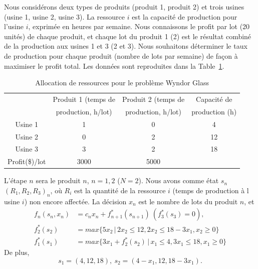 \begin{example}
Nous considérons deux types de produits (produit 1, produit 2) et trois usines (usine 1, usine 2, usine 3).
La ressource $i$ est la capacité de production pour l'usine $i$, exprimée en heures par semaine.
Nous connaissons le profit par lot (20 unités) de chaque produit, et chaque lot du produit 1 (2) est le résultat combiné de la production aux usines 1 et 3 (2 et 3).
Nous souhaitons déterminer le taux de production pour chaque produit (nombre de lots par semaine) de façon à maximiser le profit total.
Les données sont reproduites dans la Table~\ref{tab:wyndor_data}.
\begin{table}[htb]
\begin{center}
\begin{tabular}{|c|c|c|c|}
\hline
& Produit 1 (temps de & Produit 2 (temps de & Capacité de \\
& production, h/lot) & production, h/lot) & production (h) \\
\hline
Usine 1 & 1 & 0 & 4 \\
\hline
Usine 2 & 0 & 2 & 12 \\
\hline
Usine 3 & 3 & 2 & 18 \\
\hline
Profit(\$)/lot & 3000 & 5000 & \\
\hline
\end{tabular}
\end{center}
\label{tab:wyndor_data}
\caption{Allocation de ressources pour le problème Wyndor Glass}
\end{table}
L'étape $n$ sera le produit $n$, $n = 1,2$ ($N = 2$).
Nous avons comme état $s_n$ $(R_1,R_2,R_3)_n$, où $R_i$ est la quantité de la ressource $i$ (temps de production à l usine $i$) non encore affectée.
La décision $x_n$ est le nombre de lots du produit $n$, et
\begin{align*}
 f_n(s_n,x_n) &= c_nx_n + f_{n+1}^*(s_{n+1})\ (f_3^*(s_3) = 0),\\
 f_2^*(s_2) &= max \lbrace 5x_2\,|\,2x_2 \leq12, 2x_2 \leq 18 - 3x_1, x_2 \geq 0 \rbrace \\
 f_1^*(s_1) &= max \lbrace 3x_1+f_2^*(s_2)\,|\,x_1 \leq 4, 3x_1 \leq 18, x_1 \geq 0 \rbrace
\end{align*}
De plus,
\[
 s_1= (4,12,18),\ s_2 = (4-x_1,12,18-3x_1).
\]


\end{example}
